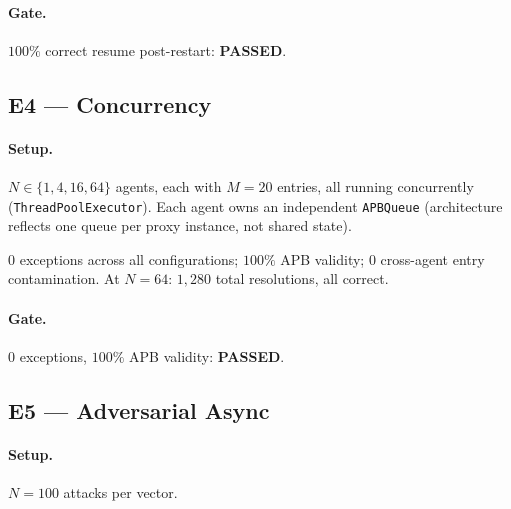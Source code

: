 \documentclass[11pt]{article}
\begin{document}
\paragraph{Gate.} $100\%$ correct resume post-restart: \textbf{PASSED}.

\subsection{E4 --- Concurrency}

\paragraph{Setup.}
$N \in \{1,4,16,64\}$ agents, each with $M=20$ entries, all
running concurrently (\texttt{ThreadPoolExecutor}). Each agent owns
an independent \texttt{APBQueue} (architecture reflects one queue per
proxy instance, not shared state).

$0$ exceptions across all configurations; $100\%$ APB validity;
$0$ cross-agent entry contamination. At $N=64$: $1{,}280$ total
resolutions, all correct.

\paragraph{Gate.} $0$ exceptions, $100\%$ APB validity:
\textbf{PASSED}.

\subsection{E5 --- Adversarial Async}

\paragraph{Setup.} $N=100$ attacks per vector.
\end{document}
